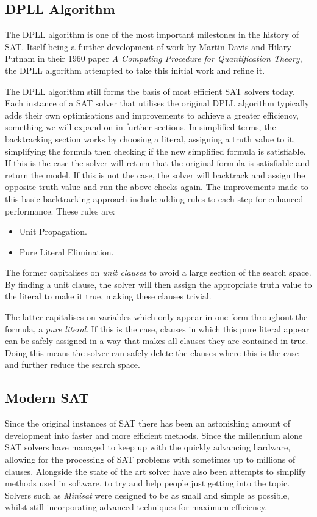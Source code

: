 \documentclass{article}
\begin{document}
\subsection{DPLL Algorithm}
The DPLL algorithm is one of the most important milestones in the history of SAT. Itself being a further development of work by
Martin Davis and Hilary Putnam in their 1960 paper \textit{A Computing Procedure for Quantification Theory}\cite{putnam}, the
DPLL algorithm attempted to take this initial work and refine it.

The DPLL algorithm still forms the basis of most efficient SAT solvers today. Each instance of a SAT solver that utilises the
original DPLL algorithm typically adds their own optimisations and improvements to achieve a greater efficiency, something we
will expand on in further sections. In simplified terms, the backtracking section works by choosing a literal, assigning a truth
value to it, simplifying the formula then checking if the new simplified formula is satisfiable. If this is the case the solver
will return that the original formula is satisfiable and return the model. If this is not the case, the solver will backtrack and
assign the opposite truth value and run the above checks again. The improvements made to this basic backtracking approach include
adding rules to each step for enhanced performance. These rules are:

\begin{itemize}
    \item Unit Propagation.
    \item Pure Literal Elimination.
\end{itemize}

The former capitalises on \textit{unit clauses} to avoid a large section of the search space. By finding a unit clause, the
solver will then assign the appropriate truth value to the literal to make it true, making these clauses trivial.

The latter capitalises on variables which only appear in one form throughout the formula, a \textit{pure literal}. If this is
the case, clauses in which this pure literal appear can be safely assigned in a way that makes all clauses they are contained in
true. Doing this means the solver can safely delete the clauses where this is the case and further reduce the search space.

\subsection{Modern SAT}
Since the original instances of SAT there has been an astonishing amount of development into
faster and more efficient methods. Since the millennium alone SAT solvers have managed to keep up
with the quickly advancing hardware, allowing for the processing of SAT problems with sometimes up
to millions of clauses. Alongside the state of the art solver have also been attempts to simplify
methods used in software, to try and help people just getting into the topic. Solvers such as
\textit{Minisat} were designed to be as small and simple as possible, whilst still incorporating
advanced techniques for maximum efficiency.
\end{document}
